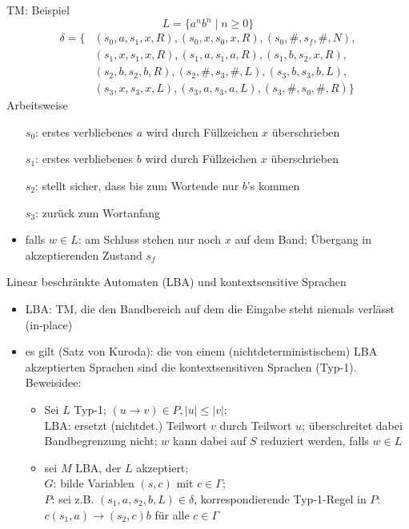 \begin{frame}{TM: Beispiel}
	$$L=\{a^nb^n \mid n\geq 0\}$$
	\begin{align*}
		\delta = \{&(s_0, a, s_1, x, R), (s_0, x, s_0, x, R), (s_0, \#, s_f, \#, N),\\
		&(s_1, x, s_1, x, R), (s_1, a, s_1, a, R), (s_1, b, s_2, x, R),\\
		&(s_2, b, s_2, b, R), (s_2, \#, s_3, \#, L), (s_3, b, s_3, b, L),\\
		&(s_3, x, s_3, x, L), (s_3, a, s_3, a, L), (s_3, \#, s_0, \#, R)\}
	\end{align*}
	\scriptsize
	Arbeitsweise
	\begin{itemize}
		\item [$s_0$:] erstes verbliebenes $a$ wird durch Füllzeichen $x$ überschrieben
		\item [$s_1$:] erstes verbliebenes $b$ wird durch Füllzeichen $x$ überschrieben
		\item [$s_2$:] stellt sicher, dass bis zum Wortende nur $b$'s kommen
		\item [$s_3$:] zurück zum Wortanfang
		\item falls $w\in L$: am Schluss stehen nur noch $x$ auf dem Band; Übergang in akzeptierenden Zustand $s_f$
	\end{itemize}
\end{frame}

\begin{frame}{Linear beschränkte Automaten (LBA) und kontextsensitive Sprachen}
	\begin{itemize}
		\item LBA: TM, die den Bandbereich auf dem die Eingabe steht niemals verlässt (in-place)
		\item es gilt (Satz von Kuroda): die von einem (nichtdeterministischem) LBA akzeptierten Sprachen sind die kontextsensitiven Sprachen (Typ-1).\\
		Beweisidee:
		\begin{itemize}
			\item Sei $L$ Typ-1; $(u \rightarrow v) \in P, |u|\leq |v|$;\\
			LBA: ersetzt (nichtdet.) Teilwort $v$ durch Teilwort $u$; überschreitet dabei Bandbegrenzung nicht; $w$ kann dabei auf $S$ reduziert werden, falls $w \in L$
			\item sei $M$ LBA, der $L$ akzeptiert;\\
			$G$: bilde Variablen $(s, c)$ mit $c \in \Gamma$;\\
			$P$: sei z.B. $(s_1, a, s_2, b, L) \in \delta$, korrespondierende Typ-1-Regel in $P$: $c(s_1, a) \rightarrow (s_2, c)b$ für alle $c \in \Gamma$
		\end{itemize}
	\end{itemize}
\end{frame}

